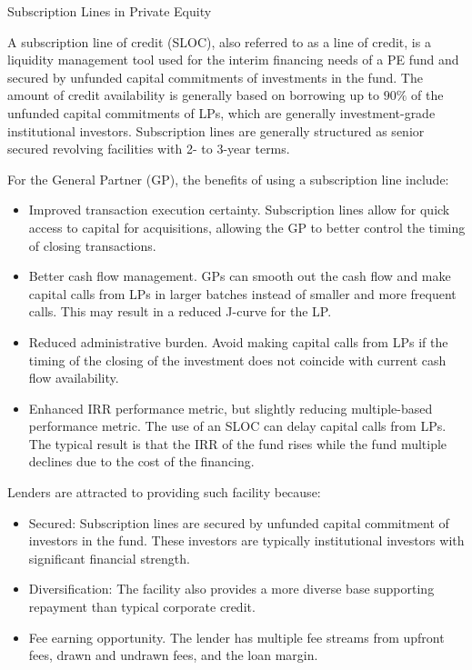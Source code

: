 \documentclass[11pt]{article}
\begin{document}
Subscription Lines in Private Equity

A subscription line of credit (SLOC), also referred to as a line of credit, is a liquidity management tool used for the interim financing needs of a PE fund and secured by unfunded capital commitments of investments in the fund. The amount of credit availability is generally based on borrowing up to $90 \%$ of the unfunded capital commitments of LPs, which are generally investment-grade institutional investors. Subscription lines are generally structured as senior secured revolving facilities with 2- to 3-year terms.

For the General Partner (GP), the benefits of using a subscription line include:

\begin{itemize}
  \item Improved transaction execution certainty. Subscription lines allow for quick access to capital for acquisitions, allowing the GP to better control the timing of closing transactions.
  \item Better cash flow management. GPs can smooth out the cash flow and make capital calls from LPs in larger batches instead of smaller and more frequent calls. This may result in a reduced J-curve for the LP.
  \item Reduced administrative burden. Avoid making capital calls from LPs if the timing of the closing of the investment does not coincide with current cash flow availability.
  \item Enhanced IRR performance metric, but slightly reducing multiple-based performance metric. The use of an SLOC can delay capital calls from LPs. The typical result is that the IRR of the fund rises while the fund multiple declines due to the cost of the financing.
\end{itemize}

Lenders are attracted to providing such facility because:

\begin{itemize}
  \item Secured: Subscription lines are secured by unfunded capital commitment of investors in the fund. These investors are typically institutional investors with significant financial strength.
  \item Diversification: The facility also provides a more diverse base supporting repayment than typical corporate credit.
  \item Fee earning opportunity. The lender has multiple fee streams from upfront fees, drawn and undrawn fees, and the loan margin.
\end{itemize}
\end{document}
